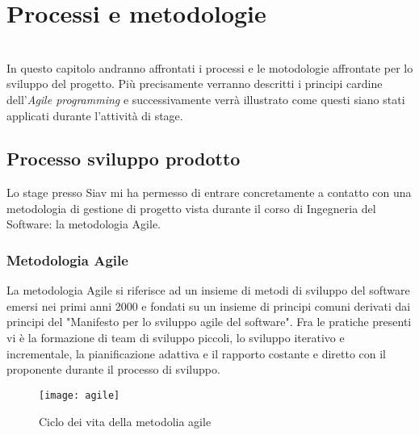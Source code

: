 
\chapter{Processi e metodologie}
\label{cap:processi-metodologie}
\\
In questo capitolo andranno affrontati i processi e le motodologie affrontate per lo sviluppo del progetto. Più precisamente verranno descritti i principi cardine dell’\textit{Agile programming}
e successivamente verrà illustrato come questi siano stati applicati durante l'attività di stage.\\

\section{Processo sviluppo prodotto}
Lo stage presso Siav mi ha permesso di entrare concretamente a contatto con una metodologia di gestione di progetto vista durante il corso di Ingegneria del Software: la metodologia Agile.
\subsection{Metodologia Agile}
La metodologia Agile si riferisce ad un insieme di metodi di sviluppo del software emersi nei primi anni 2000 e fondati su un insieme di principi comuni derivati dai principi del "Manifesto per lo sviluppo agile del software". 
Fra le pratiche presenti vi è la formazione di team di sviluppo piccoli, lo sviluppo iterativo e incrementale, la pianificazione adattiva e il rapporto costante e diretto con il proponente durante il processo di sviluppo.
\begin{figure}[!h] 
	\centering 
	\texttt{[image: agile]} 
	\caption{Ciclo dei vita della metodolia agile}
\end{figure}
